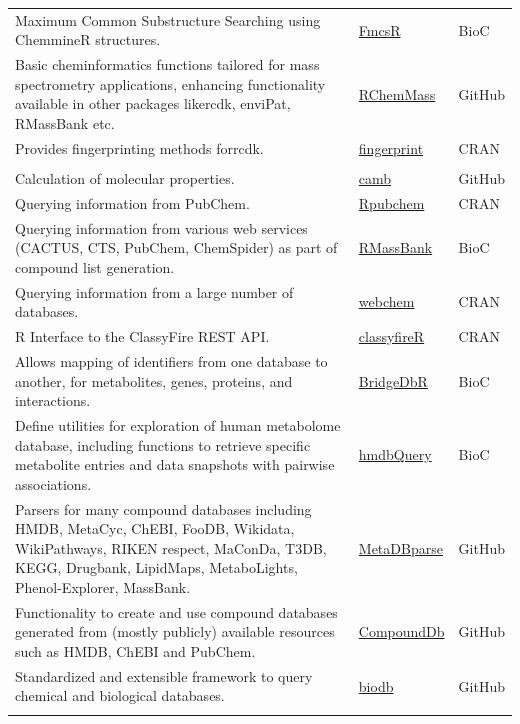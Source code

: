 \documentclass[]{article}
\begin{document}
\begin{longtable}[t]{>{\raggedright\arraybackslash}p{30em}>{\raggedright\arraybackslash}p{10em}>{\raggedright\arraybackslash}p{3em}}
Maximum Common Substructure Searching using ChemmineR structures. & \href{https://doi.org/doi:10.18129/B9.bioc.fmcsR}{FmcsR} & BioC\\
\rowcolor{gray!6}  Basic cheminformatics functions tailored for mass spectrometry applications, enhancing functionality available in other packages likercdk, enviPat, RMassBank etc. & \href{https://github.com/schymane/RChemMass}{RChemMass} & GitHub\\
Provides fingerprinting methods forrcdk. & \href{https://cran.r-project.org/package=fingerprint}{fingerprint} & CRAN\\
\rowcolor{gray!6}  \addlinespace[0.3em]
\multicolumn{3}{l}{\textbf{Database queries}}\\
Calculation of molecular properties. & \href{https://github.com/cambDI/camb}{camb} & GitHub\\
Querying information from PubChem. & \href{https://cran.r-project.org/package=rpubchem}{Rpubchem} & CRAN\\
\rowcolor{gray!6}  Querying information from various web services (CACTUS, CTS, PubChem, ChemSpider) as part of compound list generation. & \href{https://doi.org/doi:10.18129/B9.bioc.RMassBank}{RMassBank} & BioC\\
Querying information from a large number of databases. & \href{https://cran.r-project.org/package=webchem}{webchem} & CRAN\\
\rowcolor{gray!6}  R Interface to the ClassyFire REST API. & \href{https://cran.r-project.org/web/packages/classyfireR/index.html}{classyfireR} & CRAN\\
Allows mapping of identifiers from one database to another, for metabolites, genes, proteins, and interactions. & \href{https://doi.org/10.18129/B9.bioc.BridgeDbR}{BridgeDbR} & BioC\\
\rowcolor{gray!6}  Define utilities for exploration of human metabolome database, including functions to retrieve specific metabolite entries and data snapshots with pairwise associations. & \href{https://doi.org/doi:10.18129/B9.bioc.hmdbQuery}{hmdbQuery} & BioC\\
Parsers for many compound databases including HMDB, MetaCyc, ChEBI, FooDB, Wikidata, WikiPathways, RIKEN respect, MaConDa, T3DB, KEGG, Drugbank, LipidMaps, MetaboLights, Phenol-Explorer, MassBank. & \href{https://github.com/UMCUGenetics/MetaDBparse}{MetaDBparse} & GitHub\\
\rowcolor{gray!6}  Functionality to create and use compound databases generated from (mostly publicly) available resources such as HMDB, ChEBI and PubChem. & \href{https://github.com/EuracBiomedicalResearch/CompoundDb}{CompoundDb} & GitHub\\
Standardized and extensible framework to query chemical and biological databases. & \href{https://github.com/pkrog/biodb}{biodb} & GitHub\\*
\end{longtable}
\end{document}
